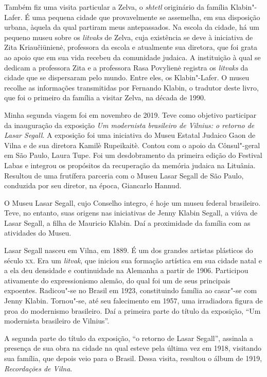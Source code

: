 Também fiz uma visita particular a Zelva, o \textit{shtetl} originário da
família Klabin"-Lafer. É uma pequena cidade que provavelmente se
assemelha, em sua disposição urbana, àquela da qual partiram meus
antepassados. Na escola da cidade, há um pequeno museu sobre os
\textit{litvaks} de Zelva, cuja existência se deve à iniciativa de Zita
Kriaučiūnienė, professora da escola e atualmente sua diretora, que foi
grata ao apoio que em sua vida recebeu da comunidade judaica. A
instituição à qual se dedicam a professora Zita e a professora Rasa
Povylienė registra os \textit{litvaks} da cidade que se dispersaram pelo
mundo. Entre eles, os Klabin"-Lafer. O museu recolhe as informações
transmitidas por Fernando Klabin, o tradutor deste livro, que foi o
primeiro da família a visitar Zelva, na década de 1990.

Minha segunda viagem foi em novembro de 2019. Teve como objetivo
participar da inauguração da exposição \textit{Um modernista brasileiro de
Vilnius: o retorno de Lasar Segall}. A exposição foi uma iniciativa do
Museu Estatal Judaico Gaon de Vilna e de sua diretora Kamilè Rupeikaitè.
Contou com o apoio da Cônsul"-geral em São Paulo, Laura Tupe. Foi um
desdobramento da primeira edição do Festival Labas e integrou os
propósitos da recuperação da memória judaica na Lituânia. Resultou de
uma frutífera parceria com o Museu Lasar Segall de São Paulo, conduzida
por seu diretor, na época, Giancarlo Hannud.

O Museu Lasar Segall, cujo Conselho integro, é hoje um museu federal
brasileiro. Teve, no entanto, suas origens nas iniciativas de Jenny
Klabin Segall, a viúva de Lasar Segall, a filha de Mauricio Klabin. Daí
a proximidade da família com as atividades do Museu.

Lasar Segall nasceu em Vilna, em 1889. É um dos grandes artistas
plásticos do século \textsc{xx}. Era um \textit{litvak}, que iniciou sua formação
artística em sua cidade natal e a ela deu densidade e continuidade na
Alemanha a partir de 1906. Participou ativamente do expressionismo
alemão, do qual foi um de seus principais expoentes. Radicou"-se no
Brasil em 1923, constituindo família ao casar"-se com Jenny Klabin.
Tornou"-se, até seu falecimento em 1957, uma irradiadora figura de proa
do modernismo brasileiro. Daí a primeira parte do título da exposição,
``Um modernista brasileiro de Vilnius''.

A segunda parte do título da exposição, ``o retorno de Lasar Segall'',
assinala a presença de sua obra na cidade na qual esteve pela última vez
em 1918, visitando sua família, que depois veio para o Brasil. Dessa
visita, resultou o álbum de 1919, \textit{Recordações de Vilna}.

